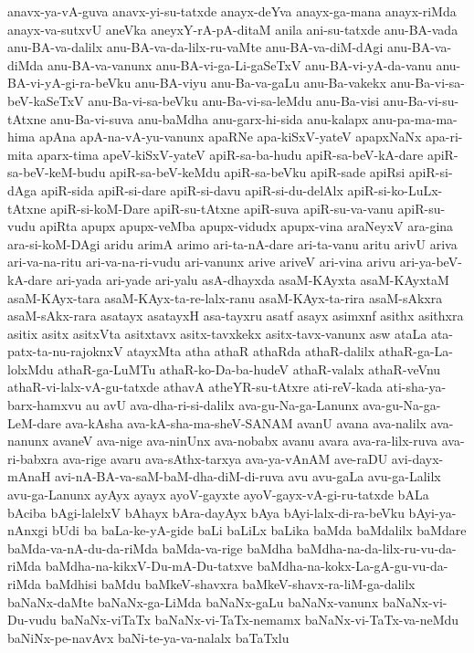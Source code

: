 {anavx-ya-vA-guva
anavx-yi-su-tatxde
anayx-deYva
anayx-ga-mana
anayx-riMda
anayx-va-sutxvU
aneVka
aneyxY-rA-pA-ditaM
anila
ani-su-tatxde
anu-BA-vada
anu-BA-va-dalilx
anu-BA-va-da-lilx-ru-vaMte
anu-BA-va-diM-dAgi
anu-BA-va-diMda
anu-BA-va-vanunx
anu-BA-vi-ga-Li-gaSeTxV
anu-BA-vi-yA-da-vanu
anu-BA-vi-yA-gi-ra-beVku
anu-BA-viyu
anu-Ba-va-gaLu
anu-Ba-vakekx
anu-Ba-vi-sa-beV-kaSeTxV
anu-Ba-vi-sa-beVku
anu-Ba-vi-sa-leMdu
anu-Ba-visi
anu-Ba-vi-su-tAtxne
anu-Ba-vi-suva
anu-baMdha
anu-garx-hi-sida
anu-kalapx
anu-pa-ma-ma-hima
apAna
apA-na-vA-yu-vanunx
apaRNe
apa-kiSxV-yateV
apapxNaNx
apa-ri-mita
aparx-tima
apeV-kiSxV-yateV
apiR-sa-ba-hudu
apiR-sa-beV-kA-dare
apiR-sa-beV-keM-budu
apiR-sa-beV-keMdu
apiR-sa-beVku
apiR-sade
apiRsi
apiR-si-dAga
apiR-sida
apiR-si-dare
apiR-si-davu
apiR-si-du-delAlx
apiR-si-ko-LuLx-tAtxne
apiR-si-koM-Dare
apiR-su-tAtxne
apiR-suva
apiR-su-va-vanu
apiR-su-vudu
apiRta
apupx
apupx-veMba
apupx-vidudx
apupx-vina
araNeyxV
ara-gina
ara-si-koM-DAgi
aridu
arimA
arimo
ari-ta-nA-dare
ari-ta-vanu
aritu
arivU
ariva
ari-va-na-ritu
ari-va-na-ri-vudu
ari-vanunx
arive
ariveV
ari-vina
arivu
ari-ya-beV-kA-dare
ari-yada
ari-yade
ari-yalu
asA-dhayxda
asaM-KAyxta
asaM-KAyxtaM
asaM-KAyx-tara
asaM-KAyx-ta-re-lalx-ranu
asaM-KAyx-ta-rira
asaM-sAkxra
asaM-sAkx-rara
asatayx
asatayxH
asa-tayxru
asatf
asayx
asimxnf
asithx
asithxra
asitix
asitx
asitxVta
asitxtavx
asitx-tavxkekx
asitx-tavx-vanunx
asw
ataLa
ata-patx-ta-nu-rajoknxV
atayxMta
atha
athaR
athaRda
athaR-dalilx
athaR-ga-La-lolxMdu
athaR-ga-LuMTu
athaR-ko-Da-ba-hudeV
athaR-valalx
athaR-veVnu
athaR-vi-lalx-vA-gu-tatxde
athavA
atheYR-su-tAtxre
ati-reV-kada
ati-sha-ya-barx-hamxvu
au
avU
ava-dha-ri-si-dalilx
ava-gu-Na-ga-Lanunx
ava-gu-Na-ga-LeM-dare
ava-kAsha
ava-kA-sha-ma-sheV-SANAM
avanU
avana
ava-nalilx
ava-nanunx
avaneV
ava-nige
ava-ninUnx
ava-nobabx
avanu
avara
ava-ra-lilx-ruva
ava-ri-babxra
ava-rige
avaru
ava-sAthx-tarxya
ava-ya-vAnAM
ave-raDU
avi-dayx-mAnaH
avi-nA-BA-va-saM-baM-dha-diM-di-ruva
avu
avu-gaLa
avu-ga-Lalilx
avu-ga-Lanunx
ayAyx
ayayx
ayoV-gayxte
ayoV-gayx-vA-gi-ru-tatxde
bALa
bAciba
bAgi-lalelxV
bAhayx
bAra-dayAyx
bAya
bAyi-lalx-di-ra-beVku
bAyi-ya-nAnxgi
bUdi
ba
baLa-ke-yA-gide
baLi
baLiLx
baLika
baMda
baMdalilx
baMdare
baMda-va-nA-du-da-riMda
baMda-va-rige
baMdha
baMdha-na-da-lilx-ru-vu-da-riMda
baMdha-na-kikxV-Du-mA-Du-tatxve
baMdha-na-kokx-La-gA-gu-vu-da-riMda
baMdhisi
baMdu
baMkeV-shavxra
baMkeV-shavx-ra-liM-ga-dalilx
baNaNx-daMte
baNaNx-ga-LiMda
baNaNx-gaLu
baNaNx-vanunx
baNaNx-vi-Du-vudu
baNaNx-viTaTx
baNaNx-vi-TaTx-nemamx
baNaNx-vi-TaTx-va-neMdu
baNiNx-pe-navAvx
baNi-te-ya-va-nalalx
baTaTxlu
}
